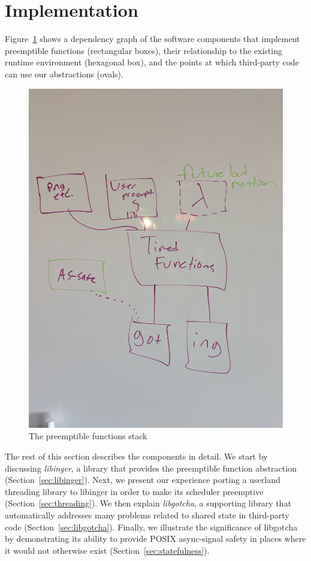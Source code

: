 \section{Implementation}

Figure~\ref{fig:architecture} shows a dependency graph of the software
components that implement preemptible functions (rectangular boxes), their
relationship to the existing
runtime environment (hexagonal box), and the points at which third-party code can use
our abstractions (ovals).

\begin{figure}
\begin{center}
\includegraphics[width=0.75\columnwidth]{figs/architecture}
\end{center}
\caption{The preemptible functions stack}
\label{fig:architecture}
\end{figure}

The rest of this section describes the components in detail.  We start by discussing
\textit{libinger}, a library that provides the preemptible function abstraction
(Section~\ref{sec:libinger}).  Next, we present our experience porting a userland
threading library to libinger in order to make its scheduler preemptive
(Section~\ref{sec:threading}).  We then explain \textit{libgotcha}, a supporting
library that automatically addresses many problems related to shared state in
third-party code (Section~\ref{sec:libgotcha}).  Finally, we illustrate the
significance of libgotcha by demonstrating its ability to provide POSIX async-signal
safety in places where it would not otherwise exist (Section~\ref{sec:statefulness}).



